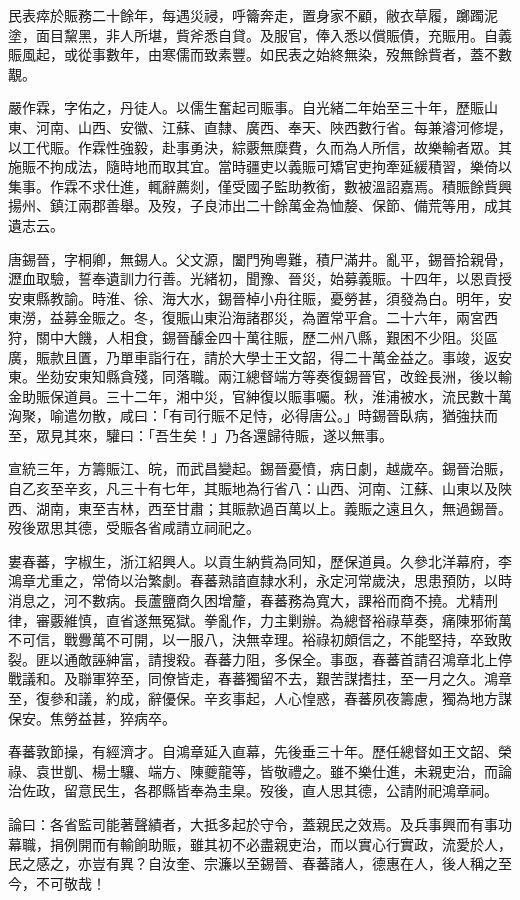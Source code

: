 \begin{pinyinscope}
民表瘁於賑務二十餘年，每遇災祲，呼籥奔走，置身家不顧，敝衣草履，躑躅泥塗，面目黧黑，非人所堪，貲斧悉自貸。及服官，俸入悉以償賑債，充賑用。自義賑風起，或從事數年，由寒儒而致素豐。如民表之始終無染，歿無餘貲者，蓋不數覯。

嚴作霖，字佑之，丹徒人。以儒生奮起司賑事。自光緒二年始至三十年，歷賑山東、河南、山西、安徽、江蘇、直隸、廣西、奉天、陜西數行省。每兼濬河修堤，以工代賑。作霖性強毅，赴事勇決，綜覈無糜費，久而為人所信，故樂輸者眾。其施賑不拘成法，隨時地而取其宜。當時疆吏以義賑可矯官吏拘牽延緩積習，樂倚以集事。作霖不求仕進，輒辭薦剡，僅受國子監助教銜，數被溫詔嘉焉。積賑餘貲興揚州、鎮江兩郡善舉。及歿，子良沛出二十餘萬金為恤嫠、保節、備荒等用，成其遺志云。

唐錫晉，字桐卿，無錫人。父文源，闔門殉粵難，積尸滿井。亂平，錫晉拾親骨，瀝血取驗，誓奉遺訓力行善。光緒初，聞豫、晉災，始募義賑。十四年，以恩貢授安東縣教諭。時淮、徐、海大水，錫晉棹小舟往賑，憂勞甚，須發為白。明年，安東澇，益募金賑之。冬，復賑山東沿海諸郡災，為置常平倉。二十六年，兩宮西狩，關中大饑，人相食，錫晉醵金四十萬往賑，歷二州八縣，艱困不少阻。災區廣，賑款且匱，乃單車詣行在，請於大學士王文韶，得二十萬金益之。事竣，返安東。坐劾安東知縣貪殘，同落職。兩江總督端方等奏復錫晉官，改銓長洲，後以輸金助賑保道員。三十二年，湘中災，官紳復以賑事囑。秋，淮浦被水，流民數十萬洶聚，喻遣勿散，咸曰：「有司行賑不足恃，必得唐公。」時錫晉臥病，猶強扶而至，眾見其來，驩曰：「吾生矣！」乃各還歸待賑，遂以無事。

宣統三年，方籌賑江、皖，而武昌變起。錫晉憂憤，病日劇，越歲卒。錫晉治賑，自乙亥至辛亥，凡三十有七年，其賑地為行省八：山西、河南、江蘇、山東以及陜西、湖南，東至吉林，西至甘肅；其賑款過百萬以上。義賑之遠且久，無過錫晉。歿後眾思其德，受賑各省咸請立祠祀之。

婁春蕃，字椒生，浙江紹興人。以貢生納貲為同知，歷保道員。久參北洋幕府，李鴻章尤重之，常倚以治繁劇。春蕃熟諳直隸水利，永定河常歲決，思患預防，以時消息之，河不數病。長蘆鹽商久困增釐，春蕃務為寬大，課裕而商不撓。尤精刑律，審覈維慎，直省遂無冤獄。拳亂作，力主剿辦。為總督裕祿草奏，痛陳邪術萬不可信，戰釁萬不可開，以一服八，決無幸理。裕祿初頗信之，不能堅持，卒致敗裂。匪以通敵誣紳富，請搜殺。春蕃力阻，多保全。事亟，春蕃首請召鴻章北上停戰議和。及聯軍猝至，同僚皆走，春蕃獨留不去，艱苦謀搘拄，至一月之久。鴻章至，復參和議，約成，辭優保。辛亥事起，人心惶惑，春蕃夙夜籌慮，獨為地方謀保安。焦勞益甚，猝病卒。

春蕃敦節操，有經濟才。自鴻章延入直幕，先後垂三十年。歷任總督如王文韶、榮祿、袁世凱、楊士驤、端方、陳夔龍等，皆敬禮之。雖不樂仕進，未親吏治，而論治佐政，留意民生，各郡縣皆奉為圭臬。歿後，直人思其德，公請附祀鴻章祠。

論曰：各省監司能著聲績者，大抵多起於守令，蓋親民之效焉。及兵事興而有事功幕職，捐例開而有輸餉助賑，雖其初不必盡親吏治，而以實心行實政，流愛於人，民之感之，亦豈有異？自汝奎、宗濂以至錫晉、春蕃諸人，德惠在人，後人稱之至今，不可敬哉！


\end{pinyinscope}